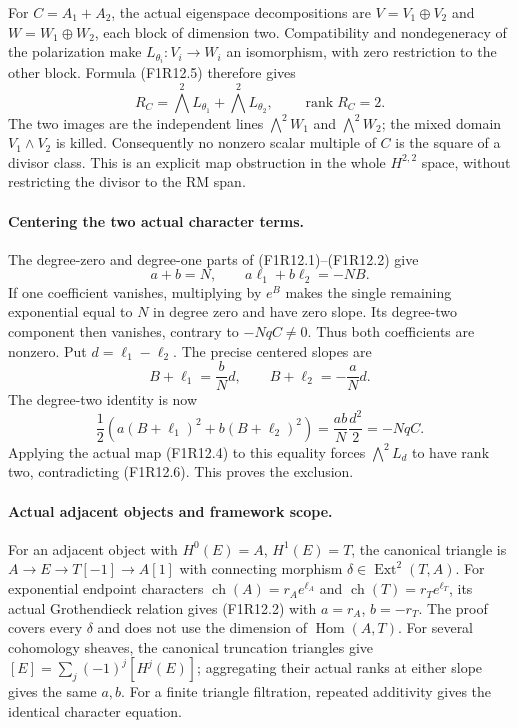 For $C=A_1+A_2$, the actual eigenspace decompositions are
$V=V_1\oplus V_2$ and $W=W_1\oplus W_2$, each block
of dimension two. Compatibility and nondegeneracy of the
polarization make $L_{\theta_i}:V_i\to W_i$ an isomorphism,
with zero restriction to the other block. Formula (F1R12.5)
therefore gives
\[
 R_C=\bigwedge^2L_{\theta_1}
                   +\bigwedge^2L_{\theta_2},\qquad
                         \operatorname{rank}R_C=2.
 \tag{F1R12.7}
\]
The two images are the independent lines
$\bigwedge^2W_1$ and $\bigwedge^2W_2$; the mixed
domain $V_1\wedge V_2$ is killed. Consequently no nonzero
scalar multiple of $C$ is the square of a divisor class.
This is an explicit map obstruction in the whole $H^{2,2}$
space, without restricting the divisor to the RM span.

\paragraph{Centering the two actual character terms.}
The degree-zero and degree-one parts of (F1R12.1)--(F1R12.2)
give
\[
       a+b=N,\qquad a\ell_1+b\ell_2=-NB.
 \tag{F1R12.8}
\]
If one coefficient vanishes, multiplying by $e^B$ makes the
single remaining exponential equal to $N$ in degree zero
and have zero slope. Its degree-two component then vanishes,
contrary to $-NqC\ne0$. Thus both coefficients are nonzero.
Put $d=\ell_1-\ell_2$. The precise centered slopes are
\[
                B+\ell_1=\frac bN d,\qquad
                B+\ell_2=-\frac aN d.
 \tag{F1R12.9}
\]
The degree-two identity is now
\[
 \frac12\left(a(B+\ell_1)^2+b(B+\ell_2)^2\right)
       =\frac{ab}{N}\frac{d^2}{2}=-NqC.
 \tag{F1R12.10}
\]
Applying the actual map (F1R12.4) to this equality forces
$\bigwedge^2L_d$ to have rank two, contradicting
(F1R12.6). This proves the exclusion.

\paragraph{Actual adjacent objects and framework scope.}
For an adjacent object with $H^0(E)=A$, $H^1(E)=T$, the
canonical triangle is $A\to E\to T[-1]\to A[1]$ with
connecting morphism $\delta\in\operatorname{Ext}^2(T,A)$.
For exponential endpoint characters
$\operatorname{ch}(A)=r_Ae^{\ell_A}$ and
$\operatorname{ch}(T)=r_Te^{\ell_T}$, its actual
Grothendieck relation gives (F1R12.2) with
$a=r_A$, $b=-r_T$. The proof covers every $\delta$ and
does not use the dimension of $\operatorname{Hom}(A,T)$.
For several cohomology sheaves, the canonical truncation
triangles give $[E]=\sum_j(-1)^j[H^j(E)]$; aggregating
their actual ranks at either slope gives the same $a,b$.
For a finite triangle filtration, repeated additivity gives
the identical character equation.

